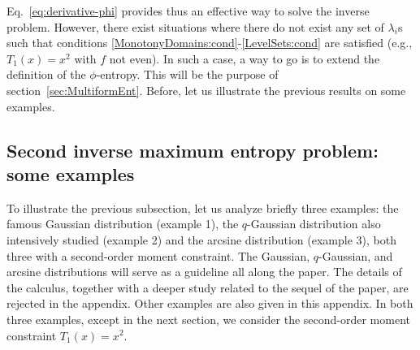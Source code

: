 \documentclass[entropy,article,submit,moreauthors,pdftex]{Definitions/mdpi}
\newcommand{\SZ}[1]{{\color{blue} #1}}                                       %
\begin{document}
\SZ{Eq.~\eqref{eq:derivative-phi}
  provides thus} an  effective way to solve the inverse  problem. However, there
exist situations  where there  do not  exist any set  of $\lambda_i$s  such that
conditions \ref{MonotonyDomains:cond}-\ref{LevelSets:cond}  are satisfied (e.g.,
$T_1(x) = x^2$ with $f$ not even). In such  a case, a way to go is to extend the
definition  of   the  $\phi$-entropy.    This  \SZ{will   be  the   purpose}  of
section~\ref{sec:MultiformEnt}.  \SZ{Before,  let  us  illustrate  the  previous
  results on some examples.}




\subsection{Second inverse maximum entropy problem: some examples}
\label{subsec:MaxPhiEntExamples}

To illustrate  the previous subsection,  let us analyze briefly  three examples:
the famous Gaussian distribution (example 1), the $q$-Gaussian distribution also
intensively studied (example  2) and the arcsine distribution  (example 3), both
three with  a second-order moment  constraint.  The Gaussian,  $q$-Gaussian, and
arcsine distributions will serve as a guideline all along the paper. The details
of the  calculus, together  with a  deeper study  related to  the sequel  of the
paper,  are rejected  in the  appendix. Other  examples are  also given  in this
appendix. In  both three examples, except  in the next section,  we consider the
second-order moment constraint $T_1(x) = x^2$.
\end{document}
